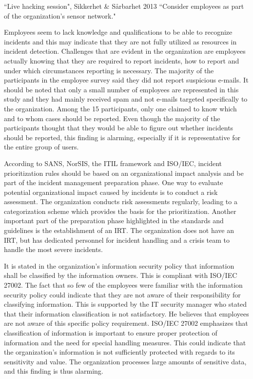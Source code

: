 \begin{newquote}{``Live hacking session", Sikkerhet \& S\aa rbarhet 2013}
``Consider employees as part of the organization's sensor network."
\end{newquote}

Employees seem to lack knowledge and qualifications to be able to recognize incidents and this may indicate that they are not fully utilized as resources in incident detection. Challenges that are evident in the organization are employees actually knowing that they are required to report incidents, how to report and under which circumstances reporting is necessary. The majority of the participants in the employee survey said they did not report suspicious e-mails. It should be noted that only a small number of employees are represented in this study and they had mainly received spam and not e-mails targeted specifically to the organization. Among the 15 participants, only one claimed to know which and to whom cases should be reported. Even though the majority of the participants thought that they would be able to figure out whether incidents should be reported, this finding is alarming, especially if it is representative for the entire group of users. 

According to SANS, NorSIS, the ITIL framework and ISO/IEC, incident prioritization rules should be based on an organizational impact analysis and be part of the incident management preparation phase. One way to evaluate potential organizational impact caused by incidents is to conduct a risk assessment. The organization conducts risk assessments regularly, leading to a categorization scheme which provides the basis for the prioritization. Another important part of the preparation phase highlighted in the standards and guidelines is the establishment of an \ac{IRT}. The organization does not have an \ac{IRT}, but has dedicated personnel for incident handling and a crisis team to handle the most severe incidents.

It is stated in the organization's information security policy that information shall be classified by the information owners. This is compliant with ISO/IEC 27002. The fact that so few of the employees were familiar with the information security policy could indicate that they are not aware of their responsibility for classifying information. This is supported by the IT security manager who stated that their information classification is not satisfactory. He believes that employees are not aware of this specific policy requirement. ISO/IEC 27002 emphasizes that classification of information is important to ensure proper protection of information and the need for special handling measures. This could indicate that the organization's information is not sufficiently protected with regards to its sensitivity and value. The organization processes large amounts of sensitive data, and this finding is thus alarming.

